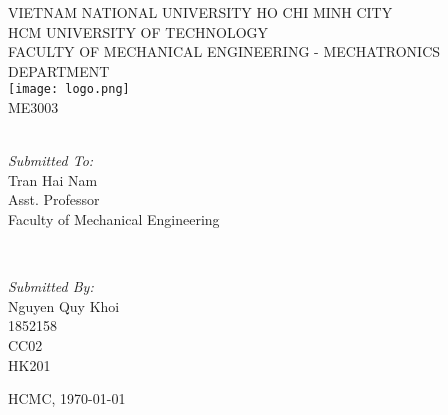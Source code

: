 	\begin{titlepage}
	\centering
	\small VIETNAM NATIONAL UNIVERSITY HO CHI MINH CITY\\
	HCM UNIVERSITY OF TECHNOLOGY\\
	FACULTY OF MECHANICAL ENGINEERING - MECHATRONICS DEPARTMENT\\[0.1\linewidth]
	
	\texttt{[image: logo.png]}\\[0.1\linewidth]	%
	\normalsize ME3003\\[0.05\linewidth]
	{\huge \bfseries \thetitle}\\[0.2\linewidth]
	
	\begin{minipage}[t]{0.4\textwidth}
		\begin{flushleft} \large
			\emph{Submitted To:}\\
			Tran Hai Nam\\
			Asst. Professor\\
			Faculty of Mechanical Engineering\\
		\end{flushleft}
	\end{minipage}~
	\begin{minipage}[t]{0.4\textwidth}
		
		\begin{flushright} \large
			\emph{Submitted By:} \\
			Nguyen Quy Khoi\\
			1852158\\
			CC02\\
			HK201\\
		\end{flushright}
		
	\end{minipage}
	\mbox{}\vfill
	{\large HCMC, \today}
\end{titlepage}